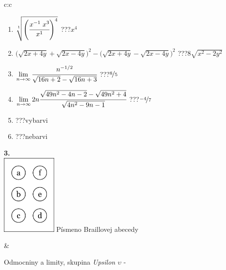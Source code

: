 \documentclass[10pt]{report}
\begin{document}
\begin{tabular}{c:c}
\begin{minipage}[c][104.5mm][t]{0.5\linewidth}
\begin{center}
\begin{minipage}{0.79\linewidth}
\begin{center}
\begin{varwidth}{\linewidth}
\begin{enumerate}
\small
\item $\sqrt[1]{\left(\cfrac{x^{-1}\;x^{3}}{x^{1}}\right)^{4}}$\quad \dotfill\; ???\;\dotfill \quad $x^{4}$
\item {\footnotesize{\scriptsize$\big(\sqrt{2x+4y}+\sqrt{2x-4y}\big)^2-\big(\sqrt{2x+4y}-\sqrt{2x-4y}\big)^2$}\quad \dotfill\; ???\;\dotfill \quad $8\sqrt{x^2-2y^2}$}
\item $\lim\limits_{n\to\infty}\cfrac{n^{-1/2}}{\sqrt{16n+2}-\sqrt{16n+3}}$\quad \dotfill\; ???\;\dotfill \quad $\nicefrac{8}{5}$
\item $\lim\limits_{n\to\infty}2n\cfrac{\sqrt{49n^2-4n-2}-\sqrt{49n^2+4}}{\sqrt{4n^2-9n-1}}$\quad \dotfill\; ???\;\dotfill \quad $\nicefrac{-4}{7}$
\item \quad \dotfill\; ???\;\dotfill \quad vybarvi
\item \quad \dotfill\; ???\;\dotfill \quad nebarvi
\end{enumerate}
\end{varwidth}
\end{center}
\end{minipage}
\begin{minipage}{0.20\linewidth}
\begin{center}
{\Huge\bfseries 3.} \\[2mm]
\includegraphics[height=40mm]{../images/braille.png}
{\small Písmeno Braillovej abecedy}
\end{center}
\end{minipage}
\end{center}
\end{minipage}
&
\begin{minipage}[c][104.5mm][t]{0.5\linewidth}
\begin{center}
\vspace{7mm}
{\huge Odmocniny a limity, skupina \textit{Upsilon $\upsilon$} -}\\[5mm]

\end{center}
\end{minipage}
\end{tabular}
\end{document}
